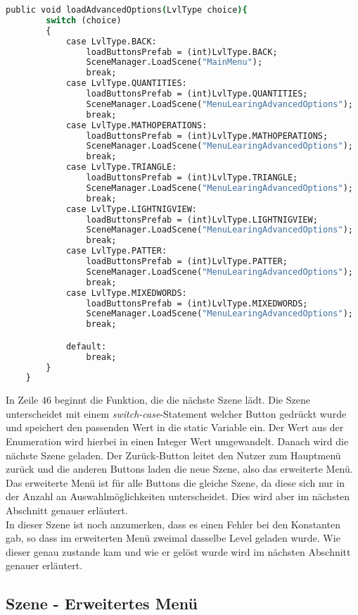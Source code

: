 \begin{lstlisting}[language=csh, caption={MenuPickLevel.cs Klasse Menü loadAdvancedOptions- Funktion}]
	public void loadAdvancedOptions(LvlType choice){
		switch (choice)
		{
			case LvlType.BACK:
				loadButtonsPrefab = (int)LvlType.BACK;
				SceneManager.LoadScene("MainMenu");
				break;
			case LvlType.QUANTITIES:
				loadButtonsPrefab = (int)LvlType.QUANTITIES;
				SceneManager.LoadScene("MenuLearingAdvancedOptions");
				break;
			case LvlType.MATHOPERATIONS:
				loadButtonsPrefab = (int)LvlType.MATHOPERATIONS;
				SceneManager.LoadScene("MenuLearingAdvancedOptions");
				break;
			case LvlType.TRIANGLE:
				loadButtonsPrefab = (int)LvlType.TRIANGLE;
				SceneManager.LoadScene("MenuLearingAdvancedOptions");
				break;
			case LvlType.LIGHTNIGVIEW:
				loadButtonsPrefab = (int)LvlType.LIGHTNIGVIEW;
				SceneManager.LoadScene("MenuLearingAdvancedOptions");
				break;
			case LvlType.PATTER:
				loadButtonsPrefab = (int)LvlType.PATTER;
				SceneManager.LoadScene("MenuLearingAdvancedOptions");
				break;
			case LvlType.MIXEDWORDS:
				loadButtonsPrefab = (int)LvlType.MIXEDWORDS;
				SceneManager.LoadScene("MenuLearingAdvancedOptions");
				break;

			default:
				break;
		}
	}
\end{lstlisting}

In Zeile 46 beginnt die Funktion, die die nächste Szene lädt. Die Szene unterscheidet mit einem \textit{switch-case}-Statement welcher Button gedrückt wurde und speichert den passenden Wert in die static Variable ein. Der Wert aus der Enumeration wird hierbei in einen Integer Wert umgewandelt. Danach wird die nächste Szene geladen. Der Zurück-Button leitet den Nutzer zum Hauptmenü zurück und die anderen Buttons laden die neue Szene, also das erweiterte Menü. Das erweiterte Menü ist für alle Buttons die gleiche Szene, da diese sich nur in der Anzahl an Auswahlmöglichkeiten unterscheidet. Dies wird aber im nächsten Abschnitt genauer erläutert.\\
In dieser Szene ist noch anzumerken, dass es einen Fehler bei den Konstanten gab, so dass im erweiterten Menü zweimal dasselbe Level geladen wurde. Wie dieser genau zustande kam und wie er gelöst wurde wird im nächsten Abschnitt genauer erläutert.

\subsection{Szene - Erweitertes Menü}
